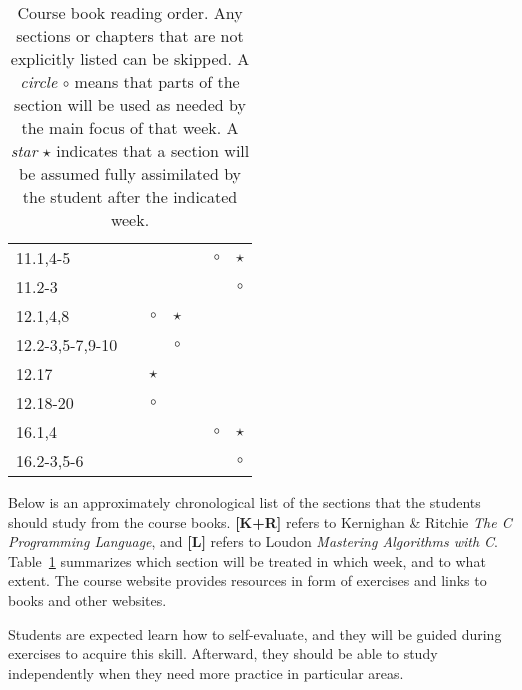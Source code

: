 \documentclass[a4paper]{article}
\newcommand{\refl}{\textbf{[L]}\xspace}
\newcommand{\refkr}{\textbf{[K+R]}\xspace}
\begin{document}
\begin{table}
\begin{minipage}[t]{0.5\columnwidth}
\begin{tabular}{|l|c|c|c|c|c|c|}
    \hline
    11.1,4-5           &         &         &         &         & $\circ$ & $\star$ \\
    11.2-3             &         &         &         &         &         & $\circ$ \\
    \hline
    12.1,4,8           &         & $\circ$ & $\star$ &         &         &         \\
    12.2-3,5-7,9-10    &         &         & $\circ$ &         &         &         \\
    12.17              &         & $\star$ &         &         &         &         \\
    12.18-20           &         & $\circ$ &         &         &         &         \\
    \hline
    16.1,4             &         &         &         &         & $\circ$ & $\star$ \\
    16.2-3,5-6         &         &         &         &         &         & $\circ$ \\
    \hline
  \end{tabular}
  \end{minipage}
  \caption{
    Course book reading order.
    Any sections or chapters that are not explicitly listed can be skipped.
    A \emph{circle} $\circ$ means that parts of the section will be used as needed by the main focus of that week.
    A \emph{star} $\star$ indicates that a section will be assumed fully assimilated by the student after the indicated week.
  }\label{tab:reading-guide}
\end{table}

Below is an approximately chronological list of the sections that the students should study from the course books.
\refkr refers to Kernighan \& Ritchie \emph{The C Programming Language}, and \refl refers to Loudon \emph{Mastering Algorithms with C}.
Table~\ref{tab:reading-guide} summarizes which section will be treated in which week, and to what extent.
The course website provides resources in form of exercises and links to books and other websites.

Students are expected learn how to self-evaluate, and they will be guided during exercises to acquire this skill.
Afterward, they should be able to study independently when they need more practice in particular areas.
\end{document}
